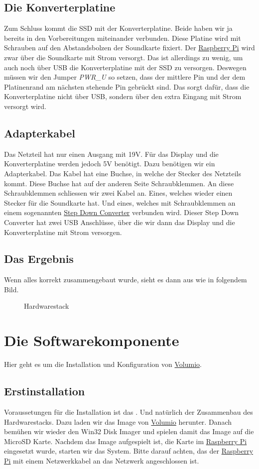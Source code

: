 \documentclass[12pt,a4paper]{article}
\newcommand{\jpaimg}[2]{\begin{figure}[H]\centering\fbox{\texttt{[image: \#1]}}\caption{#2}\label{fig:#2}\end{figure}}
\newcommand{\rpi}{\href{https://www.raspberrypi.org/}{Raspberry Pi}}
\newcommand{\vol}{\href{https://volumio.org/}{Volumio}}
\begin{document}
\subsection{Die Konverterplatine}
Zum Schluss kommt die SSD mit der Konverterplatine. Beide haben wir ja bereits in den Vorbereitungen miteinander verbunden. Diese Platine wird mit Schrauben auf
den Abstandsbolzen der Soundkarte fixiert. Der \rpi{} wird zwar über die Soundkarte mit Strom versorgt. Das ist allerdings zu wenig, um auch noch über USB die
Konverterplatine mit der SSD zu versorgen. Deswegen müssen wir den Jumper \textit{PWR\_U} so setzen, dass der mittlere Pin und der dem Platinenrand am nächsten
stehende Pin gebrückt sind. Das sorgt dafür, dass die Konverterplatine nicht über USB, sondern über den extra Eingang mit Strom versorgt wird.

\subsection{Adapterkabel}
Das Netzteil hat nur einen Ausgang mit 19V. Für das Display und die Konverterplatine werden jedoch 5V benötigt. Dazu benötigen wir ein Adapterkabel. Das Kabel
hat eine Buchse, in welche der Stecker des Netzteils kommt. Diese Buchse hat auf der anderen Seite Schraubklemmen. An diese Schraubklemmen schliessen wir zwei
Kabel an. Eines, welches wieder einen Stecker für die Soundkarte hat. Und eines, welches mit Schraubklemmen an einem sogenannten
\href{https://de.wikipedia.org/wiki/Abw\%C3\%A4rtswandler}{Step Down Converter} verbunden wird. Dieser Step Down Converter hat zwei USB Anschlüsse, über die wir
dann das Display und die Konverterplatine mit Strom versorgen.

\newpage
\subsection{Das Ergebnis}
Wenn alles korrekt zusammengebaut wurde, sieht es dann aus wie in folgendem Bild.

\jpaimg{./../images/bbwopwr.png}{Hardwarestack}

\newpage
\section{Die Softwarekomponente}
Hier geht es um die Installation und Konfiguration von \vol{}.

\subsection{Erstinstallation}
Voraussetungen für die Installation ist das . Und natürlich der Zusammenbau des Hardwarestacks. Dazu laden wir das Image von
\vol{} herunter. Danach bemühen wir wieder den Win32 Disk Imager und spielen damit das Image auf die MicroSD Karte. Nachdem das Image aufgespielt ist, die Karte
im \rpi{} eingesetzt wurde, starten wir das System. Bitte darauf achten, das der \rpi{} mit einem Netzwerkkabel an das Netzwerk angeschlossen ist.
\end{document}
